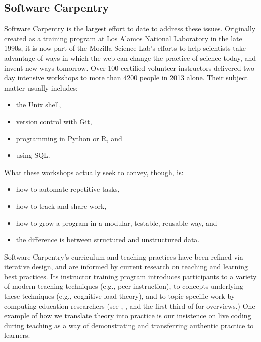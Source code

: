 \documentclass[11pt]{article}
\begin{document}
\subsection{Software Carpentry}

Software Carpentry \cite{swcsite,wilson2012} is the largest effort to
date to address these issues. Originally created as a training program
at Los Alamos National Laboratory in the late 1990s, it is now part of
the Mozilla Science Lab's efforts to help scientists take advantage of
ways in which the web can change the practice of science today, and
invent new ways tomorrow.  Over 100 certified volunteer instructors
delivered two-day intensive workshops to more than 4200 people in 2013
alone.  Their subject matter usually includes:

\begin{itemize}
\item
  the Unix shell,
\item
  version control with Git,
\item
  programming in Python or R, and
\item
  using SQL.
\end{itemize}

What these workshops actually seek to convey, though, is:

\begin{itemize}
\item
  how to automate repetitive tasks,
\item
  how to track and share work,
\item
  how to grow a program in a modular, testable, reusable way, and
\item
  the difference is between structured and unstructured data.
\end{itemize}

Software Carpentry's curriculum and teaching practices have been
refined via iterative design, and are informed by current research on
teaching and learning best practices.  Its instructor training program
introduces participants to a variety of modern teaching techniques
(e.g., peer instruction), to concepts underlying these techniques
(e.g., cognitive load theory), and to topic-specific work by computing
education researchers (see \cite{guzdial2010}, \cite{hazzan2011}, and
the first third of \cite{sorva2012} for overviews.)  One example of
how we translate theory into practice is our insistence on live coding
during teaching as a way of demonstrating and transferring authentic
practice to learners.
\end{document}
